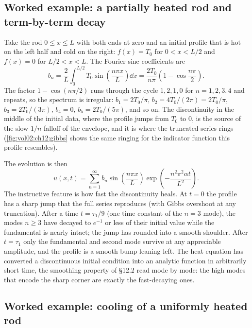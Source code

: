 \subsection{Worked example: a partially heated rod and term-by-term decay}

Take the rod $0 \leq x \leq L$ with both ends at zero and an
initial profile that is hot on the left half and cold on the right:
$f(x) = T_{0}$ for $0 < x < L/2$ and $f(x) = 0$ for $L/2 < x < L$.
The Fourier sine coefficients are
\[
b_{n} = \frac{2}{L}\int_{0}^{L/2} T_{0} \sin\!\left(\frac{n\pi x}{L}\right)\dd x = \frac{2 T_{0}}{n\pi}\left(1 - \cos\frac{n\pi}{2}\right).
\]
The factor $1 - \cos(n\pi/2)$ runs through the cycle $1, 2, 1, 0$
for $n = 1, 2, 3, 4$ and repeats, so the spectrum is irregular:
$b_{1} = 2T_{0}/\pi$, $b_{2} = 4T_{0}/(2\pi) = 2T_{0}/\pi$, $b_{3}
= 2T_{0}/(3\pi)$, $b_{4} = 0$, $b_{5} = 2T_{0}/(5\pi)$, and so on.
The discontinuity in the middle of the initial data, where the
profile jumps from $T_{0}$ to $0$, is the source of the slow $1/n$
falloff of the envelope, and it is where the truncated series rings
(\cref{fig:vol02:ch12:gibbs} shows the same ringing for the
indicator function this profile resembles).

The evolution is then
\[
u(x, t) = \sum_{n=1}^{\infty} b_{n} \sin\!\left(\frac{n\pi x}{L}\right) \exp\!\left(-\frac{n^{2}\pi^{2}\alpha t}{L^{2}}\right).
\]
The instructive feature is how fast the discontinuity heals. At
$t = 0$ the profile has a sharp jump that the full series
reproduces (with Gibbs overshoot at any truncation). After a time
$t = \tau_{1}/9$ (one time constant of the $n = 3$ mode), the modes
$n \geq 3$ have decayed to $e^{-1}$ or less of their initial value
while the fundamental is nearly intact; the jump has rounded
into a smooth shoulder. After $t = \tau_{1}$ only the fundamental
and second mode survive at any appreciable amplitude, and the
profile is a smooth bump leaning left. The heat equation has
converted a discontinuous initial condition into an analytic
function in arbitrarily short time, the smoothing property of
\S12.2 read mode by mode: the high modes that encode the sharp
corner are exactly the fast-decaying ones.

\subsection{Worked example: cooling of a uniformly heated rod}

